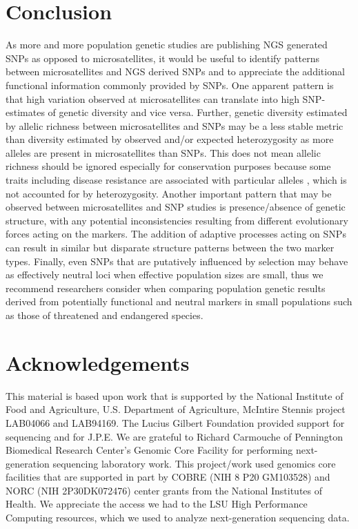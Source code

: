 \documentclass[english]{article}\usepackage[]{graphicx}\usepackage[]{color}
\begin{document}
\section*{Conclusion}
As more and more population genetic studies are publishing NGS generated SNPs as opposed to microsatellites, it would be useful to identify patterns between microsatellites and NGS derived SNPs and to appreciate the additional functional information commonly provided by SNPs. One apparent pattern is that high variation observed at microsatellites can translate into high SNP-estimates of genetic diversity \citep{Ryynanen_et_al_2007} and vice versa. Further, genetic diversity estimated by allelic richness between microsatellites and SNPs may be a less stable metric than diversity estimated by observed and/or expected heterozygosity as more alleles are present in microsatellites than SNPs. This does not mean allelic richness should be ignored especially for conservation purposes because some traits including disease resistance are associated with particular alleles \citep[e.g.,][]{Langefors_et_al_2001}, which is not accounted for by heterozygosity. Another important pattern that may be observed between microsatellites and SNP studies is presence/absence of genetic structure, with any potential inconsistencies resulting from different evolutionary forces acting on the markers. The addition of adaptive processes acting on SNPs can result in similar but disparate structure patterns between the two marker types. Finally, even SNPs that are putatively influenced by selection may behave as effectively neutral loci when effective population sizes are small, thus we recommend researchers consider when comparing population genetic results derived from potentially functional and neutral markers in small populations such as those of threatened and endangered species.

\section*{Acknowledgements}
\noindent
This material is based upon work that is supported by the National Institute of Food and Agriculture, U.S. Department of Agriculture, McIntire Stennis project LAB04066 and LAB94169. The Lucius Gilbert Foundation provided support for sequencing and for J.P.E. We are grateful to Richard Carmouche of Pennington Biomedical Research Center's Genomic Core Facility for performing next-generation sequencing laboratory work. This project/work used genomics core facilities that are supported in part by COBRE (NIH 8 P20 GM103528) and NORC (NIH 2P30DK072476) center grants from the National Institutes of Health. We appreciate the access we had to the LSU High Performance Computing resources, which we used to analyze next-generation sequencing data.
\end{document}
